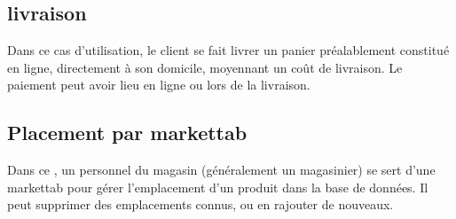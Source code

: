 \subsection{livraison}
Dans ce cas d'utilisation, le client se fait livrer un panier préalablement constitué en ligne, directement à son domicile, moyennant un coût de livraison.
Le paiement peut avoir lieu en ligne ou lors de la livraison.

\subsection{Placement par markettab}
Dans ce \cu, un personnel du magasin (généralement un magasinier) se sert d'une markettab pour gérer l'emplacement d'un produit dans la base de données.
Il peut supprimer des emplacements connus, ou en rajouter de nouveaux.
